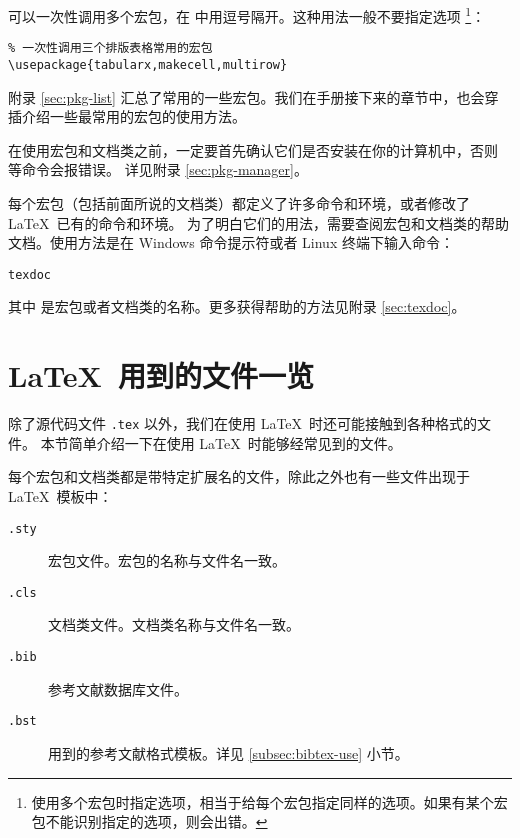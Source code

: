 可以一次性调用多个宏包，在  中用逗号隔开。这种用法一般不要指定选项%
\footnote{使用多个宏包时指定选项，相当于给每个宏包指定同样的选项。如果有某个宏包不能识别指定的选项，则会出错。}：
\begin{verbatim}
% 一次性调用三个排版表格常用的宏包
\usepackage{tabularx,makecell,multirow}
\end{verbatim}

附录 \ref{sec:pkg-list} 汇总了常用的一些宏包。我们在手册接下来的章节中，也会穿插介绍一些最常用的宏包的使用方法。

在使用宏包和文档类之前，一定要首先确认它们是否安装在你的计算机中，否则  等命令会报错误。
详见附录 \ref{sec:pkg-manager}。

每个宏包（包括前面所说的文档类）都定义了许多命令和环境，或者修改了 \LaTeX\ 已有的命令和环境。
为了明白它们的用法，需要查阅宏包和文档类的帮助文档。使用方法是在 Windows 命令提示符或者 Linux 终端下输入命令：
\begin{command}
\texttt{texdoc} 
\end{command}

其中  是宏包或者文档类的名称。更多获得帮助的方法见附录 \ref{sec:texdoc}。

\section{\LaTeX\ 用到的文件一览}\label{sec:latex-files}

除了源代码文件 \texttt{.tex} 以外，我们在使用 \LaTeX\ 时还可能接触到各种格式的文件。
本节简单介绍一下在使用 \LaTeX\ 时能够经常见到的文件。

每个宏包和文档类都是带特定扩展名的文件，除此之外也有一些文件出现于 \LaTeX\ 模板中：
\begin{description}
  \item[\texttt{.sty}] 宏包文件。宏包的名称与文件名一致。
  \item[\texttt{.cls}] 文档类文件。文档类名称与文件名一致。
  \item[\texttt{.bib}]  参考文献数据库文件。
  \item[\texttt{.bst}]  用到的参考文献格式模板。详见 \ref{subsec:bibtex-use} 小节。
\end{description}

